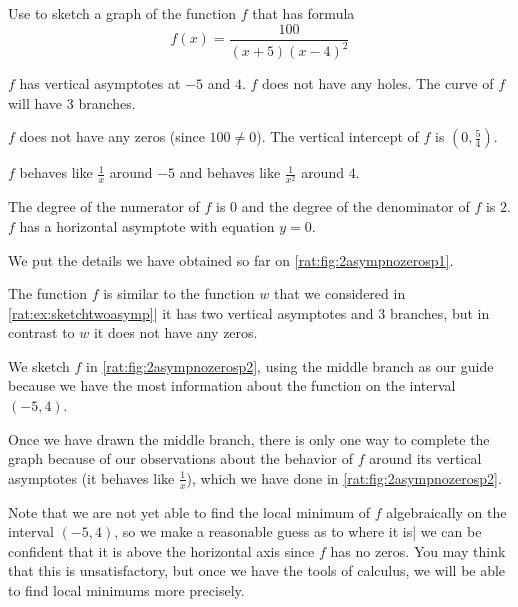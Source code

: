  \begin{pccexample}\label{rat:ex:2asympnozeros}
	 Use  to sketch a graph of the function $f$
	 that has formula
	 \[
		 f(x)=\frac{100}{(x+5)(x-4)^2}
	 \]
	 \begin{pccsolution}
		 \begin{steps}
			 \item $f$ has vertical asymptotes at $-5$ and $4$. $f$ does not have
			 any holes. The curve of $f$ will have $3$ branches.
			 \item $f$ does not have any zeros (since $100\ne 0$). The vertical intercept of $f$
			 is $\left( 0,\frac{5}{4} \right)$.
			 \item $f$ behaves like $\frac{1}{x}$ around $-5$ and behaves like $\frac{1}{x^2}$
			 around $4$.
			 \item The degree of the numerator of $f$ is $0$ and the degree of the
			 denominator of $f$ is $2$. $f$ has a horizontal asymptote with
			 equation $y=0$.
			 \item We put the details we have obtained so far on \cref{rat:fig:2asympnozerosp1}.

			 The function $f$ is similar to the function $w$ that we considered in \cref{rat:ex:sketchtwoasymp}|
			 it has two vertical asymptotes and $3$ branches, but in contrast to $w$ it does not have any zeros.

			 We sketch $f$ in \cref{rat:fig:2asympnozerosp2}, using the middle branch as our guide
			 because we have the most information about the function on the interval $(-5,4)$.

			 Once we have drawn the middle branch, there is only one way to complete the graph
			 because of our observations about the behavior of $f$ around its vertical asymptotes (it behaves like $\frac{1}{x}$),
			 which we have done in \cref{rat:fig:2asympnozerosp2}.

			 Note that we are not yet able to find the local minimum of $f$ algebraically on the interval $(-5,4)$,
			 so we make a reasonable guess as to where it is| we can be confident that it is above the horizontal axis
			 since $f$ has no zeros. You may think that this is unsatisfactory, but once we have the tools of calculus, we will
			 be able to find local minimums more precisely.
		 \end{steps}
	 \end{pccsolution}
 \end{pccexample}


